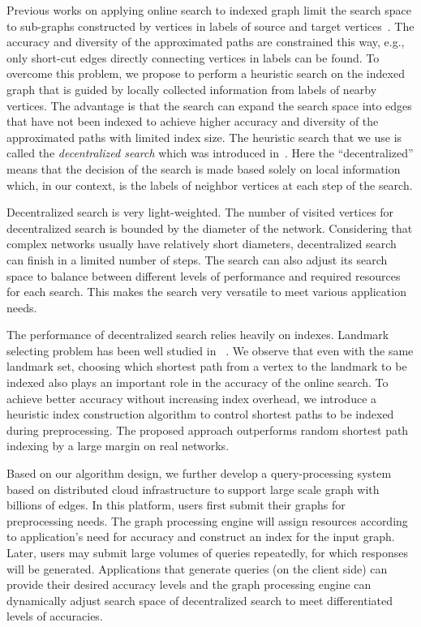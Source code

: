 Previous works on applying online search to indexed graph limit the search space to sub-graphs constructed by vertices in labels of source and target vertices~\cite{Gubichev:2010:FAE:1871437.1871503, 6399472}. The accuracy and diversity of the approximated paths are constrained this way, e.g., only short-cut edges directly connecting vertices in labels can be found. To overcome this problem, we propose to perform a heuristic search on the indexed graph that is guided by locally collected information from labels of nearby vertices. The advantage is that the search can expand the search space into edges that have not been indexed to achieve higher accuracy and diversity of the approximated paths with limited index size. The heuristic search that we use is called the \emph{decentralized search} which was introduced in~\cite{Kleinberg:2000p5066, kleinberg2006complex}. Here the ``decentralized'' means that the decision of the search is made based solely on local information which, in our context, is the labels of neighbor vertices at each step of the search.

Decentralized search is very light-weighted. The number of visited vertices for decentralized search is bounded by the diameter of the network. Considering that complex networks usually have relatively short diameters, decentralized search can finish in a limited number of steps. The search can also adjust its search space to balance between different levels of performance and required resources for each search. This makes the search very versatile to meet various application needs.

The performance of decentralized search relies heavily on indexes. Landmark selecting problem has been well studied in ~\cite{Potamias:2009:FSP:1645953.1646063,6927522}. We observe that even with the same landmark set, choosing which shortest path from a vertex to the landmark to be indexed also plays an important role in the accuracy of the online search. To achieve better accuracy without increasing index overhead, we introduce a heuristic index construction algorithm to control shortest paths to be indexed during preprocessing. The proposed approach outperforms random shortest path indexing by a large margin on real networks.

Based on our algorithm design, we further develop a query-processing system based on distributed cloud infrastructure to support large scale graph with billions of edges. In this platform, users first submit their graphs for preprocessing needs. The graph processing engine will assign resources according to application's need for accuracy and construct an index for the input graph. Later, users may submit large volumes of queries repeatedly, for which responses will be generated. Applications that generate queries (on the client side) can provide their desired accuracy levels and the graph processing engine can dynamically adjust search space of decentralized search to meet differentiated levels of accuracies.

